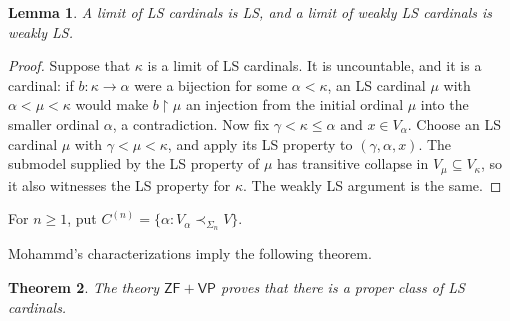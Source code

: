 \documentclass[11pt,a4paper]{amsart}
\DeclareRobustCommand{\revision}[1]{#1}
\newcommand{\VP}{\mathsf{VP}}
\newcommand{\ZF}{\mathsf{ZF}}
\newcommand{\restr}{\mathbin{\upharpoonright}}
\theoremstyle{plain}
\newtheorem{theorem}{Theorem}[section]
\newtheorem{lemma}[theorem]{Lemma}
\theoremstyle{definition}
\theoremstyle{remark}
\begin{document}
\begin{lemma}\label{lem:limits-LS}
A limit of LS cardinals is LS, and a limit of weakly LS cardinals is weakly LS.
\end{lemma}

\begin{proof}
\begingroup

Suppose that $\kappa$ is a limit of LS cardinals.  It is uncountable, and it is a cardinal: if $b:\kappa\to\alpha$ were a bijection for some $\alpha<\kappa$, an LS cardinal $\mu$ with $\alpha<\mu<\kappa$ would make $b\restr\mu$ an injection from the initial ordinal $\mu$ into the smaller ordinal $\alpha$, a contradiction.  Now fix $\gamma<\kappa\leq\alpha$ and $x\in V_\alpha$.  Choose an LS cardinal $\mu$ with $\gamma<\mu<\kappa$, and apply its LS property to $(\gamma,\alpha,x)$.  The submodel supplied by the LS property of $\mu$ has transitive collapse in $V_\mu\subseteq V_\kappa$, so it also witnesses the LS property for $\kappa$.  The weakly LS argument is the same.
\endgroup
\end{proof}

For $n\geq1$, put $C^{(n)}=\{\alpha:V_\alpha\prec_{\Sigma_n}V\}$.

\revision{Mohammd's characterizations \cite[Theorems~3.1 and~2.8]{Mohammd} imply the following theorem.}

\begin{theorem}\label{thm:Vopenka-LS}
The theory $\ZF+\VP$ proves that there is a proper class of LS cardinals.
\end{theorem}
\end{document}

